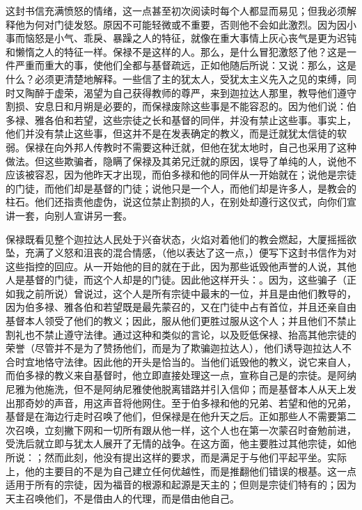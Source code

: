 这封书信充满愤怒的情绪，这一点甚至初次阅读时每个人都显而易见；但我必须解释他为何对门徒发怒。原因不可能轻微或不重要，否则他不会如此激烈。因为因小事而恼怒是小气、乖戾、暴躁之人的特征，就像在重大事情上灰心丧气是更为迟钝和懒惰之人的特征一样。保禄不是这样的人。那么，是什么冒犯激怒了他？这是一件严重而重大的事，使他们全都与基督疏远，正如他随后所说：又说：那么，这是什么？必须更清楚地解释。一些信了主的犹太人，受犹太主义先入之见的束缚，同时又陶醉于虚荣，渴望为自己获得教师的尊严，来到迦拉达人那里，教导他们遵守割损、安息日和月朔是必要的，而保禄废除这些事是不能容忍的。因为他们说：伯多禄、雅各伯和若望，这些宗徒之长和基督的同伴，并没有禁止这些事。事实上，他们并没有禁止这些事，但这并不是在发表确定的教义，而是迁就犹太信徒的软弱。保禄在向外邦人传教时不需要这种迁就，但他在犹太地时，自己也采用了这种做法。但这些欺骗者，隐瞒了保禄及其弟兄迁就的原因，误导了单纯的人，说他不应该被容忍，因为他昨天才出现，而伯多禄和他的同伴从一开始就在；说他是宗徒的门徒，而他们却是基督的门徒；说他只是一个人，而他们却是许多人，是教会的柱石。他们还指责他虚伪，说这位禁止割损的人，在别处却遵行这仪式，向你们宣讲一套，向别人宣讲另一套。\par

保禄既看见整个迦拉达人民处于兴奋状态，火焰对着他们的教会燃起，大厦摇摇欲坠，充满了义怒和沮丧的混合情感，（他以表达了这一点，）便写下这封书信作为对这些指控的回应。从一开始他的目的就在于此，因为那些诋毁他声誉的人说，其他人是基督的门徒，而这个人却是的门徒。因此他这样开头：。因为，这些骗子（正如我之前所说）曾说过，这个人是所有宗徒中最末的一位，并且是由他们教导的，因为伯多禄、雅各伯和若望既是最先蒙召的，又在门徒中占有首位，并且还亲自由基督本人领受了他们的教义；因此，服从他们更胜过服从这个人；并且他们不禁止割礼也不禁止遵守法律。通过这种和类似的言论，以及贬低保禄、抬高其他宗徒的荣誉（尽管并不是为了赞扬他们，而是为了欺骗迦拉达人），他们诱导迦拉达人不合时宜地恪守法律。因此他的开头是恰当的。当他们诋毁他的教义，说它来自人，而伯多禄的教义来自基督时，他立即直接处理这一点，宣称自己是的宗徒。是阿纳尼雅为他施洗，但不是阿纳尼雅使他脱离错路并引入信仰；而是基督本人从天上发出那奇妙的声音，用这声音将他网住。至于伯多禄和他的兄弟、若望和他的兄弟，基督是在海边行走时召唤了他们，但保禄是在他升天之后。正如那些人不需要第二次召唤，立刻撇下网和一切所有跟从他一样，这个人也在第一次蒙召时奋勉前进，受洗后就立即与犹太人展开了无情的战争。在这方面，他主要胜过其他宗徒，如他所说：；然而此刻，他没有提出这样的要求，而是满足于与他们平起平坐。实际上，他的主要目的不是为自己建立任何优越性，而是推翻他们错误的根基。这一点适用于所有的宗徒，因为福音的根源和起源是天主的；但则是宗徒们特有的；因为天主召唤他们，不是借由人的代理，而是借由他自己。\par

